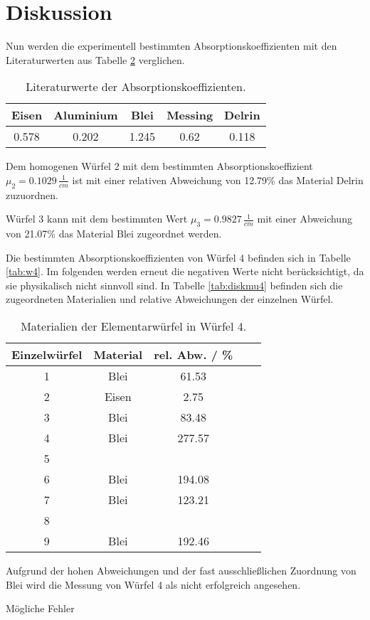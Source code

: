 \section{Diskussion}
\label{sec:Diskussion}

\noindent
Nun werden die experimentell bestimmten Absorptionskoeffizienten mit den Literaturwerten aus Tabelle \ref{tab:lit} verglichen.


\begin{table}
    \centering
    \begin{tabular}{c c c c c}
    \toprule
    Eisen & Aluminium & Blei & Messing & Delrin\\
     \midrule 
    0.578 & 0.202 & 1.245 & 0.62 & 0.118\\
\bottomrule
\end{tabular}
\caption{Literaturwerte der Absorptionskoeffizienten.}
\label{tab:lit}
\end{table}
    
\noindent
Dem homogenen Würfel 2 mit dem bestimmten Absorptionskoeffizient $\mu_2 = 0.1029 \, \frac{1}{cm}$ ist mit einer relativen Abweichung von 12.79\% das Material Delrin zuzuordnen.

\noindent
Würfel 3 kann mit dem bestimmten Wert $\mu_3 = 0.9827 \, \frac{1}{cm}$ mit einer Abweichung von 21.07\% das Material Blei zugeordnet werden.

\noindent
Die bestimmten Absorptionskoeffizienten von Würfel 4 befinden sich in Tabelle \ref{tab:w4}.
Im folgenden werden erneut die negativen Werte nicht berücksichtigt, da sie physikalisch nicht sinnvoll sind.
In Tabelle \ref{tab:diskmu4} befinden sich die zugeordneten Materialien und relative Abweichungen der einzelnen Würfel.

\begin{table}
    \centering
    \begin{tabular}{c c c c c}
    \toprule
    Einzelwürfel & Material & rel. Abw. / \% \\
     \midrule 
    1 & Blei & 61.53\\
    2 & Eisen & 2.75 \\
    3 & Blei & 83.48\\
    4 & Blei & 277.57\\
    5 &  &\\
    6 & Blei &194.08\\
    7 & Blei &123.21\\
    8 &  &\\
    9 & Blei &192.46\\
\bottomrule
\end{tabular}
\caption{Materialien der Elementarwürfel in Würfel 4.}
\label{tab:lit}
\end{table}

\noindent
Aufgrund der hohen Abweichungen und der fast ausschließlichen Zuordnung von Blei wird die Messung von Würfel 4 als nicht erfolgreich angesehen.

\noindent
Mögliche Fehler